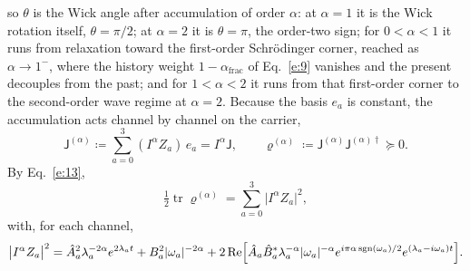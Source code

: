 \documentclass[10pt]{article}
\newcommand{\sJ}{\mathsf{J}}
\newcommand{\afrac}{\alpha_{\mathrm{frac}}}
\newcommand{\tr}{\operatorname{tr}}
\DeclareMathOperator{\Real}{Re}
\begin{document}
so $\theta$ is the Wick angle after accumulation of order $\alpha$: at $\alpha=1$ it is the Wick rotation itself, $\theta=\pi/2$; at $\alpha=2$ it is $\theta=\pi$, the order-two sign; for $0<\alpha<1$ it runs from relaxation toward the first-order Schr\"odinger corner, reached as $\alpha\to1^-$, where the history weight $1-\afrac$ of Eq.~\eqref{e:9} vanishes and the present decouples from the past; and for $1<\alpha<2$ it runs from that first-order corner to the second-order wave regime at $\alpha=2$. Because the basis $e_a$ is constant, the accumulation acts channel by channel on the carrier,
\begin{equation}
\sJ^{(\alpha)}\coloneqq\sum_{a=0}^{3}(I^\alpha Z_a)\,e_a=I^\alpha\sJ,\qquad \varrho^{(\alpha)}\coloneqq\sJ^{(\alpha)}\sJ^{(\alpha)\dagger}\succeq0.\label{e:23}
\end{equation}
By Eq.~\eqref{e:13},
\begin{equation}
\tfrac12\tr\varrho^{(\alpha)}=\sum_{a=0}^{3}\bigl|I^\alpha Z_a\bigr|^2,\label{e:24}
\end{equation}
with, for each channel,
\begin{equation}
\bigl|I^\alpha Z_a\bigr|^2=\hat A_a^2\lambda_a^{-2\alpha}e^{2\lambda_at}+B_a^2|\omega_a|^{-2\alpha}+2\Real\Bigl[\hat A_a\hat B_a^*\lambda_a^{-\alpha}|\omega_a|^{-\alpha}e^{i\pi\alpha\,\mathrm{sgn}(\omega_a)/2}e^{(\lambda_a-i\omega_a)t}\Bigr].\label{e:25}
\end{equation}
\end{document}
